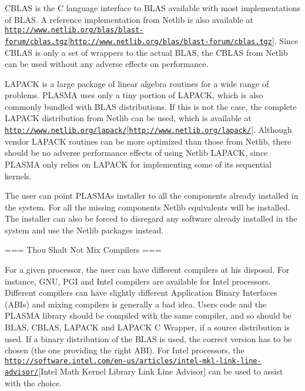 C\+B\+L\+A\+S is the C language interface to B\+L\+A\+S available with most implementations of B\+L\+A\+S. A reference implementation from Netlib is also available at \href{http://www.netlib.org/blas/blast-forum/cblas.tgz}{\tt http\+://www.\+netlib.\+org/blas/blast-\/forum/cblas.\+tgz}\mbox{[}\href{http://www.netlib.org/blas/blast-forum/cblas.tgz}{\tt http\+://www.\+netlib.\+org/blas/blast-\/forum/cblas.\+tgz}\mbox{]}. Since C\+B\+L\+A\+S is only a set of wrappers to the actual B\+L\+A\+S, the C\+B\+L\+A\+S from Netlib can be used without any adverse effects on performance.

L\+A\+P\+A\+C\+K is a large package of linear algebra routines for a wide range of problems. P\+L\+A\+S\+M\+A uses only a tiny portion of L\+A\+P\+A\+C\+K, which is also commonly bundled with B\+L\+A\+S distributions. If this is not the case, the complete L\+A\+P\+A\+C\+K distribution from Netlib can be used, which is available at \href{http://www.netlib.org/lapack/}{\tt http\+://www.\+netlib.\+org/lapack/}\mbox{[}\href{http://www.netlib.org/lapack/}{\tt http\+://www.\+netlib.\+org/lapack/}\mbox{]}. Although vendor L\+A\+P\+A\+C\+K routines can be more optimized than those from Netlib, there should be no adverse performance effects of using Netlib L\+A\+P\+A\+C\+K, since P\+L\+A\+S\+M\+A only relies on L\+A\+P\+A\+C\+K for implementing some of its sequential kernels.

The user can point P\+L\+A\+S\+M\+A\textquotesingle{}s installer to all the components already installed in the system. For all the missing components Netlib equivalents will be installed. The installer can also be forced to disregard any software already installed in the system and use the Netlib packages instead.

=== Thou Shalt Not Mix Compilers ===

For a given processor, the user can have different compilers at his disposal. For instance, G\+N\+U, P\+G\+I and Intel compilers are available for Intel processors. Different compilers can have slightly different Application Binary Interfaces (A\+B\+Is) and mixing compilers is generally a bad idea. User\textquotesingle{}s code and the P\+L\+A\+S\+M\+A library should be compiled with the same compiler, and so should be B\+L\+A\+S, C\+B\+L\+A\+S, L\+A\+P\+A\+C\+K and L\+A\+P\+A\+C\+K C Wrapper, if a source distribution is used. If a binary distribution of the B\+L\+A\+S is used, the correct version has to be chosen (the one providing the right A\+B\+I). For Intel processors, the \href{http://software.intel.com/en-us/articles/intel-mkl-link-line-advisor/}{\tt http\+://software.\+intel.\+com/en-\/us/articles/intel-\/mkl-\/link-\/line-\/advisor/}\mbox{[}Intel Math Kernel Library Link Line Advisor\mbox{]} can be used to assist with the choice.

